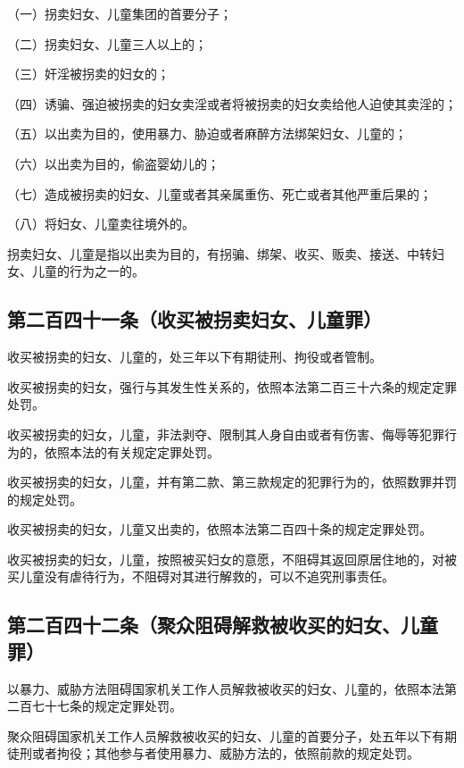 \documentclass[utf-8,10pt]{ctexart}%
\begin{document}
（一）拐卖妇女、儿童集团的首要分子；

（二）拐卖妇女、儿童三人以上的；

（三）奸淫被拐卖的妇女的；

（四）诱骗、强迫被拐卖的妇女卖淫或者将被拐卖的妇女卖给他人迫使其卖淫的；

（五）以出卖为目的，使用暴力、胁迫或者麻醉方法绑架妇女、儿童的；

（六）以出卖为目的，偷盗婴幼儿的；

（七）造成被拐卖的妇女、儿童或者其亲属重伤、死亡或者其他严重后果的；

（八）将妇女、儿童卖往境外的。

拐卖妇女、儿童是指以出卖为目的，有拐骗、绑架、收买、贩卖、接送、中转妇女、儿童的行为之一的。
\subsection{第二百四十一条（收买被拐卖妇女、儿童罪）}
收买被拐卖的妇女、儿童的，处三年以下有期徒刑、拘役或者管制。

收买被拐卖的妇女，强行与其发生性关系的，依照本法第二百三十六条的规定定罪处罚。

收买被拐卖的妇女，儿童，非法剥夺、限制其人身自由或者有伤害、侮辱等犯罪行为的，依照本法的有关规定定罪处罚。

收买被拐卖的妇女，儿童，并有第二款、第三款规定的犯罪行为的，依照数罪并罚的规定处罚。

收买被拐卖的妇女，儿童又出卖的，依照本法第二百四十条的规定定罪处罚。

收买被拐卖的妇女，儿童，按照被买妇女的意愿，不阻碍其返回原居住地的，对被买儿童没有虐待行为，不阻碍对其进行解救的，可以不追究刑事责任。
\subsection{第二百四十二条（聚众阻碍解救被收买的妇女、儿童罪）}
以暴力、威胁方法阻碍国家机关工作人员解救被收买的妇女、儿童的，依照本法第二百七十七条的规定定罪处罚。

聚众阻碍国家机关工作人员解救被收买的妇女、儿童的首要分子，处五年以下有期徒刑或者拘役；其他参与者使用暴力、威胁方法的，依照前款的规定处罚。
\end{document}
